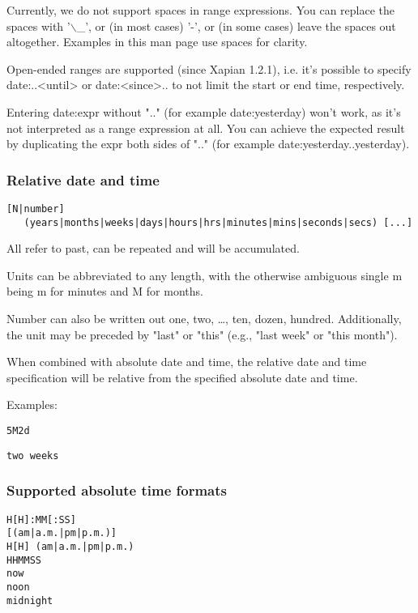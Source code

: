 \documentclass[a4,onecolumn,portrait]{article}
\begin{document}
Currently, we do not support spaces in range expressions. You can replace the spaces with '$\backslash$\_', or (in most cases) '-', or (in some cases) leave the spaces out altogether. Examples in this man page use spaces for clarity.

Open-ended ranges are supported (since Xapian 1.2.1), i.e. it's possible to specify date:..<until> or date:<since>.. to not limit the start or end time, respectively.

Entering date:expr without ".." (for example date:yesterday) won't work, as it's not interpreted as a range expression at all. You can achieve the expected result by duplicating the expr both sides of ".." (for example date:yesterday..yesterday).
\subsubsection{Relative date and time}
\label{sec-8-3-2}

\begin{verbatim}
[N|number]
   (years|months|weeks|days|hours|hrs|minutes|mins|seconds|secs) [...]
\end{verbatim}

All refer to past, can be repeated and will be accumulated.

Units can be abbreviated to any length, with the otherwise ambiguous single m being m for minutes and M for months.

Number can also be written out one, two, \ldots{}, ten, dozen, hundred.  Additionally, the unit may be preceded by "last" or "this" (e.g., "last week" or "this month").

When combined with absolute date and time, the relative date and time specification will be relative from the specified absolute date and time.

Examples:

\begin{verbatim}
5M2d
\end{verbatim}

\begin{verbatim}
two weeks
\end{verbatim}
\subsubsection{Supported absolute time formats}
\label{sec-8-3-3}

\begin{verbatim}
H[H]:MM[:SS]
[(am|a.m.|pm|p.m.)]
H[H] (am|a.m.|pm|p.m.)
HHMMSS
now
noon
midnight
\end{verbatim}
\end{document}
